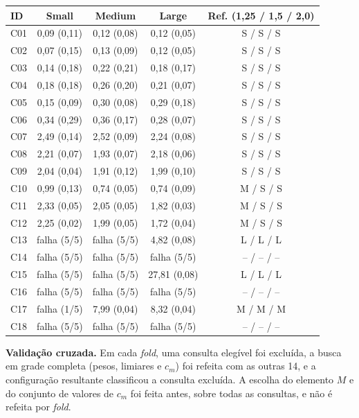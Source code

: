 \begin{center}
\footnotesize
\begin{tabular}{lcccc}
\hline
\textbf{ID} & \textbf{Small} & \textbf{Medium} & \textbf{Large} & \textbf{Ref. (1,25 / 1,5 / 2,0)} \\
\hline
	C01 & 0,09 (0,11) & 0,12 (0,08) & 0,12 (0,05) & S / S / S \\
	C02 & 0,07 (0,15) & 0,13 (0,09) & 0,12 (0,05) & S / S / S \\
	C03 & 0,14 (0,18) & 0,22 (0,21) & 0,18 (0,17) & S / S / S \\
	C04 & 0,18 (0,18) & 0,26 (0,20) & 0,21 (0,07) & S / S / S \\
	C05 & 0,15 (0,09) & 0,30 (0,08) & 0,29 (0,18) & S / S / S \\
	C06 & 0,34 (0,29) & 0,36 (0,17) & 0,28 (0,07) & S / S / S \\
	C07 & 2,49 (0,14) & 2,52 (0,09) & 2,24 (0,08) & S / S / S \\
	C08 & 2,21 (0,07) & 1,93 (0,07) & 2,18 (0,06) & S / S / S \\
	C09 & 2,04 (0,04) & 1,91 (0,12) & 1,99 (0,10) & S / S / S \\
	C10 & 0,99 (0,13) & 0,74 (0,05) & 0,74 (0,09) & M / S / S \\
	C11 & 2,33 (0,05) & 2,05 (0,05) & 1,82 (0,03) & M / S / S \\
	C12 & 2,25 (0,02) & 1,99 (0,05) & 1,72 (0,04) & M / S / S \\
	C13 & falha (5/5) & falha (5/5) & 4,82 (0,08) & L / L / L \\
	C14 & falha (5/5) & falha (5/5) & falha (5/5) & -- / -- / -- \\
	C15 & falha (5/5) & falha (5/5) & 27,81 (0,08) & L / L / L \\
	C16 & falha (5/5) & falha (5/5) & falha (5/5) & -- / -- / -- \\
	C17 & falha (1/5) & 7,99 (0,04) & 8,32 (0,04) & M / M / M \\
	C18 & falha (5/5) & falha (5/5) & falha (5/5) & -- / -- / -- \\
\hline
\end{tabular}
\end{center}


\textbf{Validação cruzada.} Em cada \textit{fold}, uma consulta elegível foi excluída, a busca em grade completa (pesos, limiares e $c_m$) foi refeita com as outras 14, e a configuração resultante classificou a consulta excluída. A escolha do elemento $M$ e do conjunto de valores de $c_m$ foi feita antes, sobre todas as consultas, e não é refeita por \textit{fold}.

